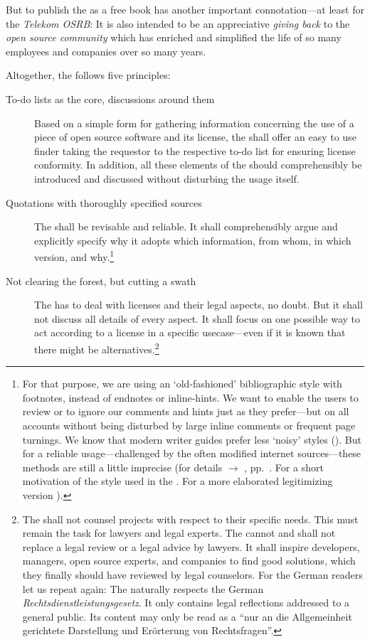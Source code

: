 But to publish the \emph{\oslic} as a free book has another important
connotation---at least for the \emph{Telekom OSRB}: It is also intended to be an
appreciative \emph{giving back} to the \emph{open source community} which has
enriched and simplified the life of so many employees and companies over so many
years. 

Altogether, the \oslic{} follows five principles:

\begin{description}
  \item[To-do lists as the core, discussions around them] Based on a simple
  form for gathering information concerning the use of a piece of open
  source software and its license, the \oslic{} shall offer an easy to use finder
  taking the requestor to the respective to-do list for ensuring license
  conformity. In addition, all these elements of the \oslic{} should comprehensibly
  be introduced and discussed without disturbing the usage itself.

  \item[Quotations with thoroughly specified sources]\label{QuotationPrinciple}
  The \oslic{} shall be revisable and reliable. It shall comprehensibly argue and
  explicitly specify why it adopts which information, from whom, in which
  version, and why.\footnote{For that purpose, we are using an `old-fashioned'
  bibliographic style with footnotes, instead of endnotes or inline-hints.
  We want to enable the users to review or to ignore our comments and hints just
  as they prefer---but on all accounts without being disturbed by large inline
  comments or frequent page turnings. We know that modern writer guides prefer
  less `noisy' styles (\cite[pars pro toto cf.][\nopage passim]{Mla2009a}). But
  for a reliable usage---challenged by the often modified internet
  sources---these methods are still a little imprecise (for details
  $\rightarrow$ \oslic, pp.\ \pageref{sec:QuotationAppendix}. For a short
  motivation of the style used in the \oslic{} \cite[cf.][\nopage
  passim]{Reincke2012a}. For a more elaborated legitimizing version
  \cite[cf.][\nopage passim]{Reincke2012b}).} 

  \item[Not clearing the forest, but cutting a swath] The \oslic{} has to deal with
  licenses and their legal aspects, no doubt. But it shall not discuss all
  details of every aspect. It shall focus on one possible way to act according
  to a license in a specific usecase---even if it is known that there might be
  alternatives.\footnote{The \oslic{} shall not counsel projects with respect to
  their specific needs. This must remain the task for lawyers and legal experts.
  The \oslic{} cannot and shall not replace a legal review or a legal advice by
  lawyers. It shall inspire developers, managers, open source experts, and
  companies to find good solutions, which they finally should have reviewed by
  legal counselors. For the German readers let us repeat again: The
  \oslic{} naturally respects the German \emph{Rechtsdienstleistungsgesetz}. It only
  contains legal reflections addressed to a general public. Its content may only
  be read as a \enquote{nur an die Allgemeinheit gerichtete Darstellung und
  Erörterung von Rechtsfragen}.}
  

\end{description}
